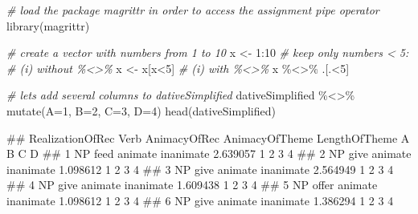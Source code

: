 \documentclass[
]{book}
\newenvironment{Shaded}{\begin{snugshade}}{\end{snugshade}}
\newcommand{\AttributeTok}[1]{\textcolor[rgb]{0.77,0.63,0.00}{#1}}
\newcommand{\CommentTok}[1]{\textcolor[rgb]{0.56,0.35,0.01}{\textit{#1}}}
\newcommand{\DecValTok}[1]{\textcolor[rgb]{0.00,0.00,0.81}{#1}}
\newcommand{\FunctionTok}[1]{\textcolor[rgb]{0.00,0.00,0.00}{#1}}
\newcommand{\NormalTok}[1]{#1}
\newcommand{\OtherTok}[1]{\textcolor[rgb]{0.56,0.35,0.01}{#1}}
\newcommand{\SpecialCharTok}[1]{\textcolor[rgb]{0.00,0.00,0.00}{#1}}
\begin{document}
\begin{Shaded}
\begin{Highlighting}[]
\CommentTok{\# load the package magrittr in order to access the assignment pipe operator}
\FunctionTok{library}\NormalTok{(magrittr)}

\CommentTok{\# create a vector with numbers from 1 to 10}
\NormalTok{x }\OtherTok{\textless{}{-}} \DecValTok{1}\SpecialCharTok{:}\DecValTok{10}
\CommentTok{\# keep only numbers \textless{} 5:}
\CommentTok{\#   (i) without \%\textless{}\textgreater{}\%}
\NormalTok{x }\OtherTok{\textless{}{-}}\NormalTok{ x[x}\SpecialCharTok{\textless{}}\DecValTok{5}\NormalTok{]}
\CommentTok{\#   (i) with \%\textless{}\textgreater{}\%}
\NormalTok{x }\SpecialCharTok{\%\textless{}\textgreater{}\%}\NormalTok{ .[.}\SpecialCharTok{\textless{}}\DecValTok{5}\NormalTok{]}
\end{Highlighting}
\end{Shaded}

\begin{Shaded}
\begin{Highlighting}[]
\CommentTok{\# lets add several columns to \textquotesingle{}dativeSimplified\textquotesingle{}}
\NormalTok{dativeSimplified }\SpecialCharTok{\%\textless{}\textgreater{}\%} \FunctionTok{mutate}\NormalTok{(}\AttributeTok{A=}\DecValTok{1}\NormalTok{, }\AttributeTok{B=}\DecValTok{2}\NormalTok{, }\AttributeTok{C=}\DecValTok{3}\NormalTok{, }\AttributeTok{D=}\DecValTok{4}\NormalTok{)}
\FunctionTok{head}\NormalTok{(dativeSimplified)}
\end{Highlighting}
\end{Shaded}

\begin{Shaded}
\begin{Highlighting}[]
\NormalTok{\#\#   RealizationOfRec  Verb AnimacyOfRec AnimacyOfTheme LengthOfTheme A B C D}
\NormalTok{\#\# 1               NP  feed      animate      inanimate      2.639057 1 2 3 4}
\NormalTok{\#\# 2               NP  give      animate      inanimate      1.098612 1 2 3 4}
\NormalTok{\#\# 3               NP  give      animate      inanimate      2.564949 1 2 3 4}
\NormalTok{\#\# 4               NP  give      animate      inanimate      1.609438 1 2 3 4}
\NormalTok{\#\# 5               NP offer      animate      inanimate      1.098612 1 2 3 4}
\NormalTok{\#\# 6               NP  give      animate      inanimate      1.386294 1 2 3 4}
\end{Highlighting}
\end{Shaded}
\end{document}
